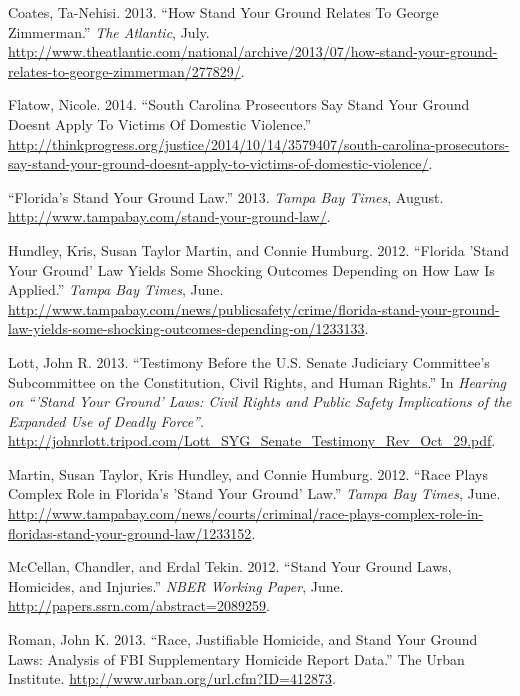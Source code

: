 \documentclass[12pt,article]{article}
\begin{document}
Coates, Ta-Nehisi. 2013. ``How Stand Your Ground Relates To George
Zimmerman.'' \emph{The Atlantic}, July.
\url{http://www.theatlantic.com/national/archive/2013/07/how-stand-your-ground-relates-to-george-zimmerman/277829/}.

Flatow, Nicole. 2014. ``South Carolina Prosecutors Say Stand Your Ground
Doesnt Apply To Victims Of Domestic Violence.''
\url{http://thinkprogress.org/justice/2014/10/14/3579407/south-carolina-prosecutors-say-stand-your-ground-doesnt-apply-to-victims-of-domestic-violence/}.

``Florida's Stand Your Ground Law.'' 2013. \emph{Tampa Bay Times},
August. \url{http://www.tampabay.com/stand-your-ground-law/}.

Hundley, Kris, Susan Taylor Martin, and Connie Humburg. 2012. ``Florida
'Stand Your Ground' Law Yields Some Shocking Outcomes Depending on How
Law Is Applied.'' \emph{Tampa Bay Times}, June.
\url{http://www.tampabay.com/news/publicsafety/crime/florida-stand-your-ground-law-yields-some-shocking-outcomes-depending-on/1233133}.

Lott, John R. 2013. ``Testimony Before the U.S. Senate Judiciary
Committee's Subcommittee on the Constitution, Civil Rights, and Human
Rights.'' In \emph{Hearing on ``'Stand Your Ground' Laws: Civil Rights
and Public Safety Implications of the Expanded Use of Deadly Force''}.
\url{http://johnrlott.tripod.com/Lott_SYG_Senate_Testimony_Rev_Oct_29.pdf}.

Martin, Susan Taylor, Kris Hundley, and Connie Humburg. 2012. ``Race
Plays Complex Role in Florida's 'Stand Your Ground' Law.'' \emph{Tampa
Bay Times}, June.
\url{http://www.tampabay.com/news/courts/criminal/race-plays-complex-role-in-floridas-stand-your-ground-law/1233152}.

McCellan, Chandler, and Erdal Tekin. 2012. ``Stand Your Ground Laws,
Homicides, and Injuries.'' \emph{NBER Working Paper}, June.
\url{http://papers.ssrn.com/abstract=2089259}.

Roman, John K. 2013. ``Race, Justifiable Homicide, and Stand Your Ground
Laws: Analysis of FBI Supplementary Homicide Report Data.'' The Urban
Institute. \url{http://www.urban.org/url.cfm?ID=412873}.
\end{document}

